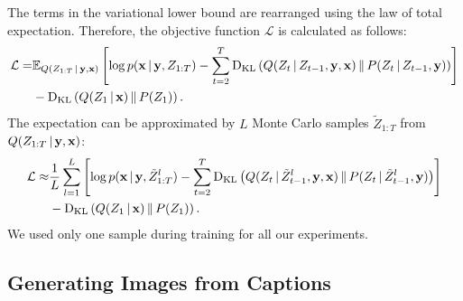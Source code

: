 \documentclass{article} %
\newcommand{\comm}[1]{}
\newcommand{\given}{\,|\,}
\newcommand{\expectation}{\mathbb{E}}
\newcommand{\kldiv}{\mathrm{D}_{\rm KL}}
\newcommand{\klBars}{\,\|\,}
\newcommand{\henc}{h^{infer}}
\newcommand{\Lat}{Z}
\newcommand{\numSamples}{L}
\newcommand{\sampleIdx}{l}
\newcommand{\LatSample}{\tilde{Z}}
\newcommand{\icaption}{{\bf{y}}}
\newcommand{\oimage}{{\bf{x}}}
\newcommand{\post}{Q}
\newcommand{\prior}{P}
\newcommand{\loss}{\mathcal{L}}
\begin{document}
The terms in the variational lower bound are rearranged using the law of total expectation. Therefore, the objective function $\loss$ is calculated as follows:
\begin{align}
\label{eq:loss}
\loss =  &\expectation_{Q(\Lat_{1:T}\given\icaption,\oimage)}\left[ \log p(\oimage\given\icaption,\Lat_{1:T}) - \sum_{t=2}^T\kldiv\left(\post(\Lat_t\given\Lat_{t-1},\icaption,\oimage)\klBars\prior(\Lat_t\given\Lat_{t-1},\icaption)\right) \right] \nonumber \\& - \kldiv\left(\post(\Lat_1\given\oimage)\klBars\prior(\Lat_1)\right).
\end{align}
The expectation can be approximated by $\numSamples$ Monte Carlo samples $\LatSample_{1:T}$ from $\post(\Lat_{1:T}\given\icaption, \oimage)$:
\begin{align}
\label{eq:loss_mc}
\loss \approx  &\frac{1}{\numSamples}\sum_{\sampleIdx=1}^\numSamples\left[ \log p(\oimage\given\icaption,\LatSample^\sampleIdx_{1:T}) - \sum_{t=2}^T\kldiv\left(\post(\Lat_t\given\LatSample^\sampleIdx_{t-1},\icaption,\oimage)\klBars\prior(\Lat_t\given\LatSample^\sampleIdx_{t-1},\icaption)\right) \right] \nonumber \\& - \kldiv\left(\post(\Lat_1\given\oimage)\klBars\prior(\Lat_1)\right).
\end{align}
We used only one sample during training for all our experiments.
\comm{
\begin{align}
\loss &= -\sum_{t=1}^{T}D_{KL}(\post(\Lat_t|\henc_t,s_{t-1})\,||\,\prior(\Lat_t)) + \frac{1}{L}\sum_{l=1}^{L}log\,p(x_{t}|y,z)\\
&=
\frac{1}{2}\sum_{t=1}^{T}(1 - 2\,log\,\sigma_{t}^{prior} + 2\,log\,\sigma_{t} - \frac{\exp(2\,log\,\sigma_{t}) + (\mu_{t} - \mu_{t}^{prior})^{2}}{\exp(2\,log\,\sigma_{t}^{prior})}) + \frac{1}{L}\sum_{l=1}^{L}log\,p(x_{t}|y,z)
\end{align}
}

\subsection{Generating Images from Captions}
\end{document}

